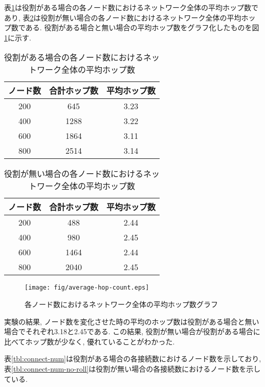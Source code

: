 表\ref{tbl:hop-count}は役割がある場合の各ノード数におけるネットワーク全体の平均ホップ数であり, 表\ref{tbl:hop-count-no-roll}は役割が無い場合の各ノード数におけるネットワーク全体の平均ホップ数である. 役割がある場合と無い場合の平均ホップ数をグラフ化したものを図\ref{fig:average-hop-count}に示す.

\begin{table}[h]
  \caption{役割がある場合の各ノード数におけるネットワーク全体の平均ホップ数}
  \label{tbl:hop-count}
  \centering
      {\small
        \begin{tabular}{|c|c|c|} \hline
        ノード数 & 合計ホップ数 & 平均ホップ数 \\ \hline \hline
        200 & 645 & 3.23 \\ \hline
        400 & 1288 & 3.22 \\ \hline
        600 & 1864 & 3.11 \\ \hline
        800 & 2514 & 3.14 \\ \hline
        \end{tabular}
      }
\end{table}

\begin{table}[h]
  \caption{役割が無い場合の各ノード数におけるネットワーク全体の平均ホップ数}
  \label{tbl:hop-count-no-roll}
  \centering
      {\small
        \begin{tabular}{|c|c|c|} \hline
        ノード数 & 合計ホップ数 & 平均ホップ数 \\ \hline \hline
        200 & 488 & 2.44 \\ \hline
        400 & 980 & 2.45 \\ \hline
        600 & 1464 & 2.44 \\ \hline
        800 & 2040 & 2.45 \\ \hline
        \end{tabular}
      }
\end{table}

\begin{figure}[h]
  \centering
  \texttt{[image: fig/average-hop-count.eps]}
  \caption{各ノード数におけるネットワーク全体の平均ホップ数グラフ}
  \label{fig:average-hop-count}
\end{figure}

実験の結果, ノード数を変化させた時の平均のホップ数は役割がある場合と無い場合でそれぞれ3.18と2.45である. この結果, 役割が無い場合が役割がある場合に比べてホップ数が少なく, 優れていることがわかった.

表\ref{tbl:connect-num}は役割がある場合の各接続数におけるノード数を示しており, 表\ref{tbl:connect-num-no-roll}は役割が無い場合の各接続数におけるノード数を示している.

